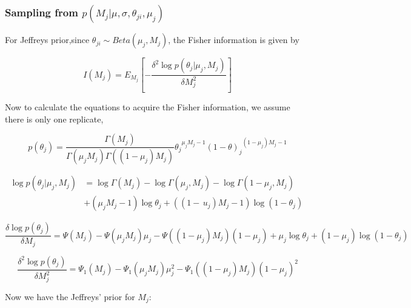 \documentclass[11pt,reqno]{amsart}
\begin{document}
\subsubsection{Sampling from $p \left( M_{j} |\mu,\sigma, \theta_{ji},\mu_j\right)$}
For Jeffreys prior,since ${\theta }_{ji}\sim Beta\left( {\mu }_{j},{M}_{j}\right)$, the Fisher information is given by

\begin{equation}\label{equ:JefferyInference}
I\left({M}_{j}\right)={E}_{{M}_{j}}\left[ -\frac{\delta ^{2}\log p\left(\theta _{j}|\mu_{j},M_{j}\right)}{\delta M^{2}_{j}}\right]
\end{equation}

Now to calculate the equations to acquire the Fisher information, we assume there is only one replicate,

\begin{equation}\label{eqn:Betapdf}
p\left({\theta }_{j} \right)= \frac{\Gamma \left({M}_{j} \right)}{\Gamma \left({\mu }_{j} {M}_{j}\right)\Gamma \left(( 1-{\mu }_{j}){M}_{j}\right)} {{\theta}_{j}}^{{\mu}_{j}{M}_{j}-1}{\left(1-\theta\right)_{j}}^{\left(1-{\mu}_{j}\right){M}_{j}-1}
\end{equation}

\begin{equation}\label{equ:JefferyInference1}
\begin{split}
\log p\left(\theta_{j}|\mu_{j},M_{j}\right)& =\log \Gamma \left(M_{j}\right)-\log \Gamma\left(\mu_{j},M_{j}\right)- \log \Gamma\left(1-\mu_{j},M_{j}\right)\\
& + (\mu_{j}M_{j}-1)\log\theta_{j} + ((1-\,u_{j})M_{j}-1)\log(1-\theta_{j})\
\end{split}
\end{equation}

\begin{equation}
\frac{\delta\log p(\theta_{j})}{\delta M_{j}} = \Psi(M_{j}) - \Psi(\mu_{j} M_{j})\mu_{j} - \Psi((1-\mu_{j})M_{j})(1-\mu_{j}) +\mu_{j}\log\theta_{j} + (1-\mu_{j})\log(1-\theta_{j})
\end{equation}

\begin{equation}
\frac{\delta^{2}\log p(\theta_{j})}{\delta M_{j}^{2}}  = \Psi_{1}(M_{j}) - \Psi_{1}(\mu_{j} M_{j})\mu_{j}^{2} - \Psi_{1}((1-\mu_{j})M_{j})(1-\mu_{j})^{2}
\end{equation}

Now we have the Jeffreys' prior for $M_{j}$:
\end{document}
